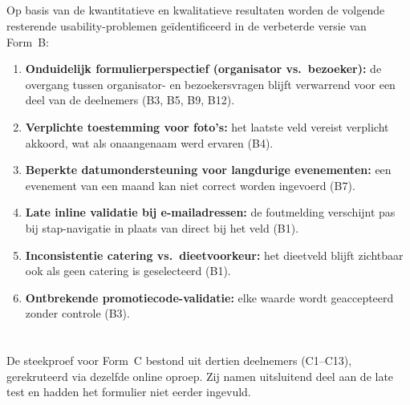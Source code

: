 \subsection{}

Op basis van de kwantitatieve en kwalitatieve resultaten worden de volgende resterende usability-problemen geïdentificeerd in de verbeterde versie van Form~B:

\begin{enumerate}
  \item \textbf{Onduidelijk formulierperspectief (organisator vs.\ bezoeker):} de overgang tussen organisator- en bezoekersvragen blijft verwarrend voor een deel van de deelnemers (B3, B5, B9, B12).
  \item \textbf{Verplichte toestemming voor foto's:} het laatste veld vereist verplicht akkoord, wat als onaangenaam werd ervaren (B4).
  \item \textbf{Beperkte datumondersteuning voor langdurige evenementen:} een evenement van een maand kan niet correct worden ingevoerd (B7).
  \item \textbf{Late inline validatie bij e-mailadressen:} de foutmelding verschijnt pas bij stap-navigatie in plaats van direct bij het veld (B1).
  \item \textbf{Inconsistentie catering vs.\ dieetvoorkeur:} het dieetveld blijft zichtbaar ook als geen catering is geselecteerd (B1).
  \item \textbf{Ontbrekende promotiecode-validatie:} elke waarde wordt geaccepteerd zonder controle (B3).
\end{enumerate}

\section{}
\label{sec:laat-formc}

\subsection{}

De steekproef voor Form~C bestond uit dertien deelnemers (C1–C13), gerekruteerd via dezelfde online oproep. Zij namen uitsluitend deel aan de late test en hadden het formulier niet eerder ingevuld.

